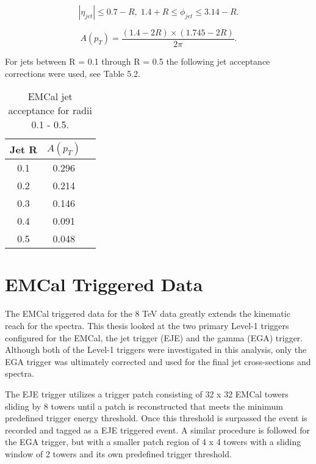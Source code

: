 \begin{equation}
|\eta_{jet}| \leq 0.7 - R, \; 1.4 + R \leq \phi_{jet} \leq 3.14 -R.
\label{eq:jetconstration}
\end{equation}

\begin{equation}
A(p_{T}) = \frac{(1.4 - 2R) \times (1.745 - 2R)}{2 \pi}.
\label{eq:acceptance}
\end{equation}

For jets between R = 0.1 through R = 0.5 the following jet acceptance corrections were used, see Table 5.2.

\begin{table}[hb]
\label{tab:AcceptanceFactor}
\begin{center}
\caption{EMCal jet acceptance for radii 0.1 - 0.5.}
\begin{tabular}[b]{|c|c|c|}
	\hline
	Jet R & $A(p_{T})$ \\ \hline
	0.1 & 0.296 \\ \hline
	0.2 & 0.214\\ \hline
	0.3 & 0.146\\ \hline
	0.4 & 0.091\\ \hline
	0.5 & 0.048\\ \hline
\end{tabular}
\end{center}

\end{table}

\section{EMCal Triggered Data}

The EMCal triggered data for the 8 TeV data greatly extends the kinematic reach for the spectra.  This thesis looked at the two primary Level-1 triggers configured for the EMCal, the jet trigger (EJE) and the gamma (EGA) trigger\cite{Bourrion:2010js}.  Although both of the Level-1 triggers were investigated in this analysis, only the EGA trigger was ultimately corrected  and used for the final jet cross-sections and spectra.  

The EJE trigger utilizes a trigger patch consisting of 32 x 32 EMCal towers sliding by 8 towers until a patch is reconstructed that meets the minimum predefined trigger energy threshold.  Once this threshold is surpassed the event is recorded and tagged as a EJE triggered event.  A similar procedure is followed for the EGA trigger, but with a smaller patch region of 4 x 4 towers with a sliding window of 2 towers and its own predefined trigger threshold.  

